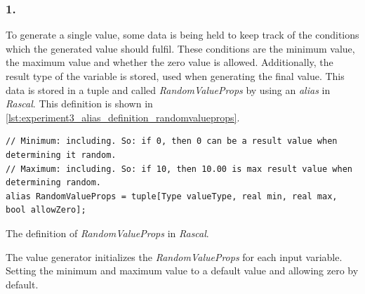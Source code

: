 \subsubsection{1. }
To generate a single value, some data is being held to keep track of the
conditions which the generated value should fulfil. These
conditions are the minimum value, the maximum value and whether the zero value
is allowed. Additionally, the result type of the variable is stored, used when
generating the final value. This data is stored in a tuple and called
\textit{RandomValueProps} by using an \textit{alias} in \textit{Rascal}. This
definition is shown in
\autoref{lst:experiment3_alias_definition_randomvalueprops}.
\begin{sourcecode}[!ht]
\begin{lstlisting}[language=Rascal]
// Minimum: including. So: if 0, then 0 can be a result value when determining it random.
// Maximum: including. So: if 10, then 10.00 is max result value when determining random.
alias RandomValueProps = tuple[Type valueType, real min, real max, bool allowZero];
\end{lstlisting}
\caption{The definition of \textit{RandomValueProps} in \textit{Rascal}.}
\label{lst:experiment3_alias_definition_randomvalueprops}
\end{sourcecode}
\FloatBarrier\noindent
The value generator initializes the \textit{RandomValueProps} for each input
variable. Setting the minimum and maximum value to a default value and allowing
zero by default.

